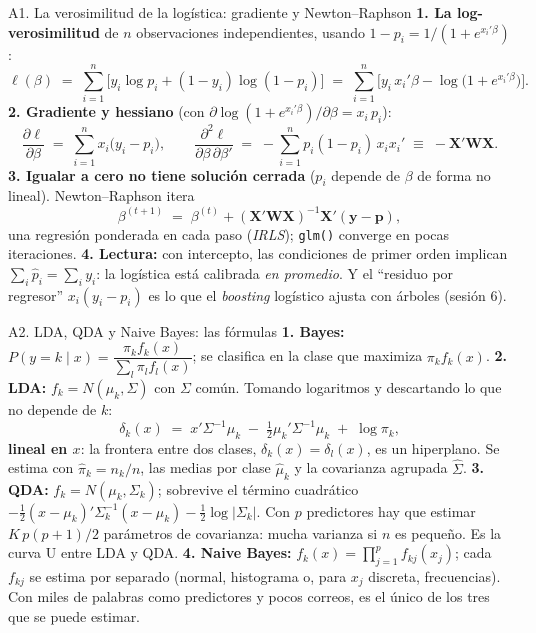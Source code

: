 \documentclass{beamer}
\newcommand{\1}{\mathbb{I}}
\begin{document}
\begin{frame}{A1. La verosimilitud de la logística: gradiente y Newton--Raphson}
\small
\textbf{1. La log-verosimilitud} de $n$ observaciones independientes, usando $1 - p_i = 1/(1 + e^{x_i'\beta})$:
\[ \ell(\beta) \;=\; \sum_{i=1}^{n} \Big[ y_i \log p_i + (1 - y_i)\log(1 - p_i) \Big] \;=\; \sum_{i=1}^{n} \Big[ y_i\, x_i'\beta - \log\big(1 + e^{x_i'\beta}\big) \Big]. \]
\pause
\textbf{2. Gradiente y hessiano} (con $\partial \log(1 + e^{x_i'\beta}) / \partial \beta = x_i\, p_i$):
\[ \frac{\partial \ell}{\partial \beta} \;=\; \sum_{i=1}^{n} x_i \big( y_i - p_i \big), \qquad \frac{\partial^2 \ell}{\partial \beta\, \partial \beta'} \;=\; -\sum_{i=1}^{n} p_i (1 - p_i)\, x_i x_i' \;\equiv\; -\mathbf{X}'\mathbf{W}\mathbf{X}. \]
\pause
\textbf{3. Igualar a cero no tiene solución cerrada} ($p_i$ depende de $\beta$ de forma no lineal). Newton--Raphson itera
\[ \beta^{(t+1)} \;=\; \beta^{(t)} + (\mathbf{X}'\mathbf{W}\mathbf{X})^{-1}\mathbf{X}'(\mathbf{y} - \mathbf{p}), \]
una regresión ponderada en cada paso (\emph{IRLS}); \texttt{glm()} converge en pocas iteraciones.
\pause
\textbf{4. Lectura:} con intercepto, las condiciones de primer orden implican $\sum_i \hat{p}_i = \sum_i y_i$: la logística está calibrada \emph{en promedio}. Y el ``residuo por regresor'' $x_i(y_i - p_i)$ es lo que el \emph{boosting} logístico ajusta con árboles (sesión 6).
\end{frame}

\begin{frame}{A2. LDA, QDA y Naive Bayes: las fórmulas}
\small
\textbf{1. Bayes:} $P(y = k \mid x) = \dfrac{\pi_k f_k(x)}{\sum_l \pi_l f_l(x)}$; se clasifica en la clase que maximiza $\pi_k f_k(x)$.
\pause
\vspace{0.05cm}
\textbf{2. LDA:} $f_k = N(\mu_k, \Sigma)$ con $\Sigma$ común. Tomando logaritmos y descartando lo que no depende de $k$:
\[ \delta_k(x) \;=\; x'\Sigma^{-1}\mu_k \;-\; \tfrac{1}{2}\mu_k'\Sigma^{-1}\mu_k \;+\; \log \pi_k, \]
\textbf{lineal en $x$}: la frontera entre dos clases, $\delta_k(x) = \delta_l(x)$, es un hiperplano. Se estima con $\hat{\pi}_k = n_k/n$, las medias por clase $\hat{\mu}_k$ y la covarianza agrupada $\hat{\Sigma}$.
\pause
\vspace{0.05cm}
\textbf{3. QDA:} $f_k = N(\mu_k, \Sigma_k)$; sobrevive el término cuadrático $-\tfrac{1}{2}(x - \mu_k)'\Sigma_k^{-1}(x - \mu_k) - \tfrac{1}{2}\log|\Sigma_k|$. Con $p$ predictores hay que estimar $K\,p(p+1)/2$ parámetros de covarianza: mucha varianza si $n$ es pequeño. Es la curva U entre LDA y QDA.
\pause
\vspace{0.05cm}
\textbf{4. Naive Bayes:} $f_k(x) = \prod_{j=1}^{p} f_{kj}(x_j)$; cada $f_{kj}$ se estima por separado (normal, histograma o, para $x_j$ discreta, frecuencias). Con miles de palabras como predictores y pocos correos, es el único de los tres que se puede estimar.
\end{frame}
\end{document}
